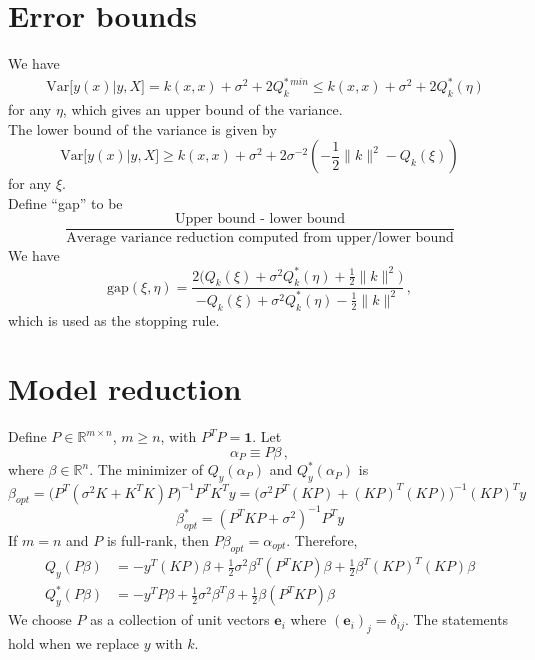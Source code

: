 \documentclass[a4paper,onecolumn]{article}
\begin{document}
\section{Error bounds}
We have 
\begin{equation*}\begin{split}
    & \textrm{Var}\big[ y(x) \Big| y, X \big] 
    = k(x,x)+ \sigma^2 + 2Q^{*\, min}_k \le k(x,x) + \sigma^2 + 2Q^*_k(\eta)
\end{split}\end{equation*}
for any $\eta$, which gives an upper bound of the variance.\\
The lower bound of the variance is given by
$$
    \textrm{Var}\big[ y(x) \Big| y, X \big] \ge k(x,x) + \sigma^2 + 2\sigma^{-2} \left(
     -\frac{1}{2} \|k\|^2 - Q_k(\xi)
    \right)
$$
for any $\xi$.\\
Define ``gap'' to be 
$$
    \frac{\textrm{Upper bound - lower bound}}{\textrm{Average variance reduction computed from upper/lower bound}}
$$
We have
$$
    \textrm{gap}(\xi, \eta) = \frac{2\Big(Q_k(\xi) + \sigma^2 Q^*_k(\eta) + \frac{1}{2}\|k\|^2\Big)}{
    - Q_k(\xi) + \sigma^2Q^*_k(\eta) - \frac{1}{2}\|k\|^2}\,,
$$
which is used as the stopping rule.
\section{Model reduction}
Define $P \in \mathbb{R}^{m\times n}$, $m\ge n$, with $P^T P = \mathbf{1}$. Let
$$
    \alpha_P \equiv P\beta\,,
$$
where $\beta \in \mathbb{R}^n$. The minimizer of $Q_y(\alpha_P)$ and $Q_y^*(\alpha_P)$ is
$$
    \beta_{opt} = \Big(
        P^T (\sigma^2 K + K^T K) P 
    \Big)^{-1} P^T K^Ty = \Big(
        \sigma^2 P^T (KP) + (KP)^T (KP)
    \Big)^{-1} (KP)^T y
$$
$$
    \beta^*_{opt} = (P^T K P + \sigma^2)^{-1} P^T y
$$
If $m=n$ and $P$ is full-rank, then $P\beta_{opt} = \alpha_{opt}$.
Therefore,
\begin{equation*}\begin{split}
    Q_y(P\beta) &= - y^T (KP) \beta + \frac{1}{2} \sigma^2 \beta^T (P^T K P)\beta 
    + \frac{1}{2} \beta^T (KP)^T (KP) \beta\\
    Q_y^*(P\beta) &= - y^T P\beta + \frac{1}{2} \sigma^2 \beta^T \beta + \frac{1}{2}\beta(P^T K P) \beta
\end{split}\end{equation*}
We choose $P$ as a collection of unit vectors $\mathbf{e}_i$ where $(\mathbf{e}_i)_j = \delta_{ij}$.
The statements hold when we replace $y$ with $k$.
\end{document}
